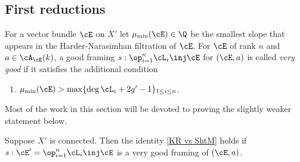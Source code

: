 \subsection{First reductions}
For a vector bundle $\cE$ on $X'$ let $\mu_{\min}(\cE)\in \Q$ be the smallest slope that appears in the Harder-Narasimhan filtration of $\cE$.  For $\cE$ of rank $n$ and $a\in \cA_{\cE}(k)$, a good framing $s:\op_{i=1}^{n}\cL_{i}\inj \cE$ for $(\cE,a)$ is called {\em very good} if it satisfies the additional condition
\begin{enumerate}
\item[(3)] $\mu_{\min}(\cE)>\max\{\deg\cL_{i}+2g'-1\}_{1\le i\le n}$.
\end{enumerate}

Most of the work in this section will be devoted to proving the slightly weaker statement below.
\begin{thm}
\notready\label{th:compare KR weak} Suppose $X'$ is connected. Then the identity \eqref{KR vs ShtM} holds if $s:\cE'=\op_{i=1}^{n}\cL_{i}\inj \cE$ is a very good framing of $(\cE,a)$.
\end{thm}


